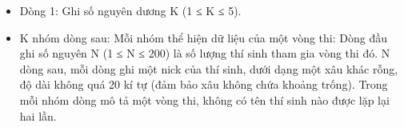 \begin{itemize}
	\item Dòng 1: Ghi số nguyên dương K (1 ≤ K ≤ 5).
	\item K nhóm dòng sau: Mỗi nhóm thể hiện dữ liệu của một vòng thi: Dòng đầu ghi số nguyên N (1 ≤ N ≤ 200) là số lượng thí sinh tham gia vòng thi đó. N dòng sau, mỗi dòng ghi một nick của thí sinh, dưới dạng một xâu khác rỗng, độ dài không quá 20 kí tự (đảm bảo xâu không chứa khoảng trống). Trong mỗi nhóm dòng mô tả một vòng thi, không có tên thí sinh nào được lặp lại hai lần.
\end{itemize}

\